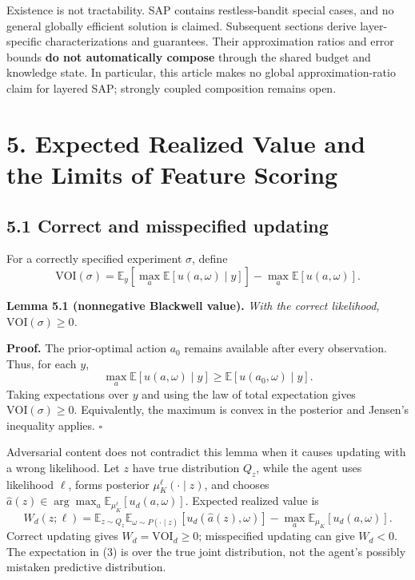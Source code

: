 \documentclass[
  11pt]{article}
\begin{document}
Existence is not tractability. SAP contains restless-bandit special cases, and no general globally efficient solution is claimed. Subsequent sections derive layer-specific characterizations and guarantees. Their approximation ratios and error bounds \textbf{do not automatically compose} through the shared budget and knowledge state. In particular, this article makes no global approximation-ratio claim for layered SAP; strongly coupled composition remains open.

\section{5. Expected Realized Value and the Limits of Feature Scoring}\label{expected-realized-value-and-the-limits-of-feature-scoring}

\subsection{5.1 Correct and misspecified updating}\label{correct-and-misspecified-updating}

For a correctly specified experiment \(\sigma\), define \[
\mathrm{VOI}(\sigma)=\mathbb E_y\!\left[\max_a\mathbb E[u(a,\omega)\mid y]\right]
-\max_a\mathbb E[u(a,\omega)].
\]

\textbf{Lemma 5.1 (nonnegative Blackwell value).} \emph{With the correct likelihood, \(\mathrm{VOI}(\sigma)\geq0\).}

\textbf{Proof.} The prior-optimal action \(a_0\) remains available after every observation. Thus, for each \(y\), \[
\max_a\mathbb E[u(a,\omega)\mid y]\geq \mathbb E[u(a_0,\omega)\mid y].
\] Taking expectations over \(y\) and using the law of total expectation gives \(\mathrm{VOI}(\sigma)\geq0\). Equivalently, the maximum is convex in the posterior and Jensen's inequality applies. \(\square\)

Adversarial content does not contradict this lemma when it causes updating with a wrong likelihood. Let \(z\) have true distribution \(Q_z\), while the agent uses likelihood \(\ell\), forms posterior \(\mu_K^\ell(\cdot\mid z)\), and chooses \(\hat a(z)\in\arg\max_a\mathbb E_{\mu_K^\ell}[u_d(a,\omega)]\). Expected realized value is \[
W_d(z;\ell)=\mathbb E_{z\sim Q_z}\mathbb E_{\omega\sim P(\cdot\mid z)}
[u_d(\hat a(z),\omega)]-\max_a\mathbb E_{\mu_K}[u_d(a,\omega)].
\tag{3}
\] Correct updating gives \(W_d=\mathrm{VOI}_d\geq0\); misspecified updating can give \(W_d<0\). The expectation in (3) is over the true joint distribution, not the agent's possibly mistaken predictive distribution.
\end{document}
